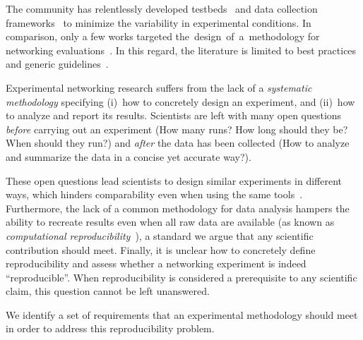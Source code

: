 The community has relentlessly developed testbeds~\cite{nussbaum17testbeds} and data collection frameworks~\cite{yan18pantheon} to minimize the variability in experimental conditions.
In comparison, only a few works targeted \mbox{the design of a methodology} for networking evaluations~\cite{kritsis2018Tutorial}.
In this regard, the literature is limited to best practices and generic guidelines~\cite{bajpai19dagstuhl_guide, saucez2018Thoughts, sevenwaystofail}.

Experimental networking research suffers from the lack of a \emph{systematic methodology} specifying
  (i)~how to concretely design an experiment, and
  (ii)~how to analyze and report its results.
Scientists are left with many open questions \emph{before} carrying out an experiment (\eg How many runs? How long should they be? When should they run?) and \emph{after} the data has been collected (\eg How to analyze and summarize the data in a concise yet accurate way?).

These open questions lead scientists to design similar experiments in different ways, which hinders comparability even when using the same tools~\cite{boano2018IoTBench}.
Furthermore, the lack of a common methodology for data analysis hampers the ability to recreate results even when all raw data are available (as known as \textit{computational reproducibility}~\cite{liu19computational}), a standard we argue that any scientific contribution should meet.
Finally, it is unclear how to concretely define reproducibility and assess whether a networking experiment is indeed ``reproducible''. When reproducibility is considered a prerequisite to any scientific claim, this question cannot be left unanswered.

We identify a set of requirements that an experimental methodology should meet in order to address this reproducibility problem.

